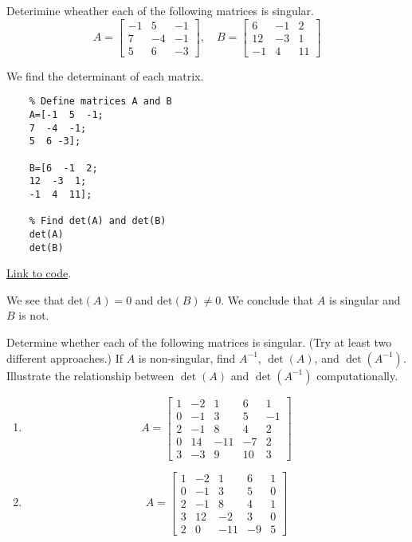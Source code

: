 \documentclass{ximera}
\begin{document}
\begin{example}
  Deterimine wheather each of the following matrices is singular.
  $$A=\begin{bmatrix}-1 & 5 & -1\\7 & -4 & -1\\5 & 6 & -3\end{bmatrix},\quad B=\begin{bmatrix}6 & -1 & 2\\12 & -3 & 1\\-1 & 4 & 11\end{bmatrix}$$
  \begin{explanation}
  We find the determinant of each matrix.
  \begin{verbatim}
    % Define matrices A and B
    A=[-1  5  -1;
    7  -4  -1;
    5  6 -3];

    B=[6  -1  2;
    12  -3  1;
    -1  4  11];

    % Find det(A) and det(B)
    det(A)
    det(B)
  \end{verbatim}

\href{https://sagecell.sagemath.org/?z=eJwtjTsKgDAQRPtA7jCNYIoU67cQiwTxEsEiaIQUWqj3x42xmreP2d0CU9jjGXD454pruGHgzw1WCjM6TUALaBqk6Dmbn9l10PXCKIUdXZc8UPFMFXMNpFpyvEKUiwXmyKe38JRGfV8SWiVFVjmtegFjQB_C&lang=octave&interacts=eJyLjgUAARUAuQ==}{Link to code}.

We see that $\text{det}(A)=0$ and $\text{det}(B)\neq 0$.  We conclude that $A$ is singular and $B$ is not.

  \end{explanation}
\end{example}

\begin{problem}\label{prob_oct_det1}
Determine whether each of the following matrices is singular. (Try at least two different approaches.)  If $A$ is non-singular, find $A^{-1}$, $\det(A)$, and $\det(A^{-1})$.  Illustrate the relationship between $\det(A)$ and $\det(A^{-1})$ computationally.
\begin{enumerate}
    \item $$A=\begin{bmatrix}1 &-2 & 1 & 6 & 1\\0 & -1 & 3 & 5 & -1\\2 & -1 & 8 & 4 & 2\\0 & 14 & -11 & -7 & 2\\3 & -3 & 9 & 10 & 3\end{bmatrix}$$
    \item $$A=\begin{bmatrix}1 &-2 & 1 & 6 &1\\0 & -1 & 3 & 5 & 0\\2 & -1 & 8 & 4 & 1\\3 & 12 & -2 & 3 & 0\\2 & 0 & -11 & -9 & 5\end{bmatrix}$$
\end{enumerate}



  \end{problem}
\end{document}
